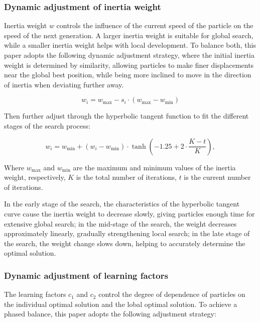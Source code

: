 \documentclass[lettersize,journal]{IEEEtran}
\begin{document}
\subsubsection{Dynamic adjustment of inertia
  weight}\label{dynamic-adjustment-of-inertia-weight}

Inertia weight \(w\) controls the influence of the current speed of the particle on the speed of the next generation. A larger inertia weight is suitable for global search, while a smaller inertia weight helps with local development. To balance both, this paper adopts the following dynamic adjustment strategy, where the initial inertia weight is determined by similarity, allowing particles to make finer displacements near the global best position, while being more inclined to move in the direction of inertia when deviating further away.

\begin{equation}
  w_{i} = w_{\text{max}} - s_{i} \cdot (w_{\text{max}} - w_{\text{min}})
  \label{eq:inertia_weight_similarity}
\end{equation}

Then further adjust through the hyperbolic tangent function to fit the different stages of the search process:

\begin{equation}
  w_{i} = w_{\text{min}} + (w_{i} - w_{\text{min}}) \cdot \tanh\left(-1.25 + 2\cdot\frac{K-t}{K}\right),
  \label{eq:inertia_weight_dynamic}
\end{equation}

Where \(w_{\max}\) and \(w_{\min}\) are the maximum and minimum values of the inertia weight, respectively, \(K\) is the total number of iterations, \(t\) is the current number of iterations.

In the early stage of the search, the characteristics of the hyperbolic tangent curve cause the inertia weight to decrease slowly, giving particles enough time for extensive global search; in the mid-stage of
the search, the weight decreases approximately linearly, gradually strengthening local search; in the late stage of the search, the weight change slows down, helping to accurately determine the optimal solution.

\subsubsection{Dynamic adjustment of learning
  factors}\label{dynamic-adjustment-of-learning-factors}

The learning factors \(c_{1}\) and \(c_{2}\) control the degree of dependence of particles on the individual optimal solution and the lobal optimal solution. To achieve a phased balance, this paper adopts the following adjustment strategy:
\end{document}

